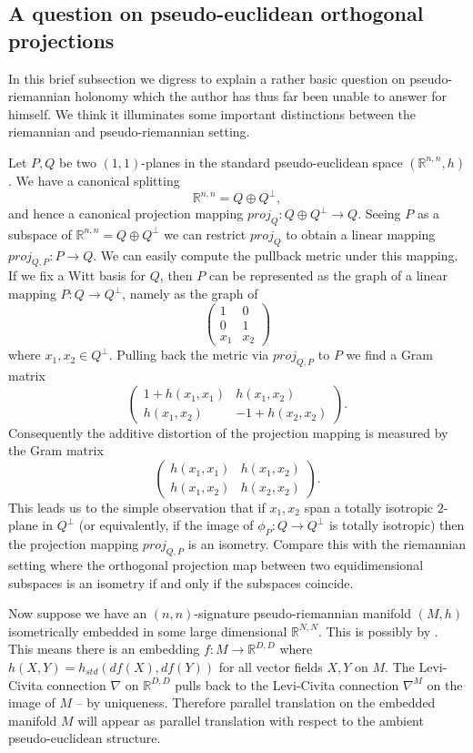 \documentclass[12pt]{amsart}
\theoremstyle{definition}
\theoremstyle{remark}
\newcommand{\bR}{\mathbb{R}}
\begin{document}
\subsection{A question on pseudo-euclidean orthogonal projections}\label{qqq}
In this brief subsection we digress to explain a rather basic question on pseudo-riemannian holonomy which the author has thus far been unable to answer for himself. We think it illuminates some important distinctions between the riemannian and pseudo-riemannian setting. 

Let $P,Q$ be two $(1,1)$-planes in the standard pseudo-euclidean space $(\bR^{n,n}, h)$. We have a canonical splitting $$\bR^{n,n}= Q \oplus Q^\perp, $$ and hence a canonical projection mapping $proj_Q: Q \oplus Q^\perp \to Q$. Seeing $P$ as a subspace of $\bR^{n,n}=Q\oplus Q^\perp$ we can restrict $proj_Q$ to obtain a linear mapping $proj_{Q,P}: P \to Q$. We can easily compute the pullback metric under this mapping. If we fix a Witt basis for $Q$, then $P$ can be represented as the graph of a linear mapping $P:Q \to Q^\perp$, namely as the graph of $$\begin{pmatrix} 1 & 0 \\ 0 & 1 \\ x_1 & x_2\end{pmatrix}$$ where $x_1, x_2 \in Q^\perp$. Pulling back the metric via $proj_{Q, P}$ to $P$ we find a Gram matrix $$\begin{pmatrix} 1 + h(x_1,x_1) & h(x_1,x_2) \\ h(x_1, x_2) & -1 + h(x_2, x_2)\end{pmatrix}.$$ Consequently the additive distortion of the projection mapping is measured by the Gram matrix $$\begin{pmatrix} h(x_1,x_1) & h(x_1,x_2) \\ h(x_1, x_2) &  h(x_2, x_2)\end{pmatrix}.$$ This leads us to the simple observation that if $x_1, x_2$ span a totally isotropic $2$-plane in $Q^\perp$ (or equivalently, if the image of $\phi_P:Q \to Q^\perp$ is totally isotropic) then the projection mapping $proj_{Q,P}$ is an isometry. Compare this with the riemannian setting where the orthogonal projection map between two equidimensional subspaces is an isometry if and only if the subspaces coincide. 

Now suppose we have an $(n,n)$-signature pseudo-riemannian manifold $(M,h)$ isometrically embedded in some large dimensional $\bR^{N,N}$. This is possibly by \cite{C}. This means there is an embedding $f: M \to \bR^{D,D}$ where $h(X,Y)=h_{std}(df(X), df(Y))$ for all vector fields $X,Y$ on $M$. The Levi-Civita connection $\nabla$ on $\bR^{D,D}$ pulls back to the Levi-Civita connection $\nabla^M$ on the image of $M$ -- by uniqueness. Therefore parallel translation on the embedded manifold $M$ will appear as parallel translation with respect to the ambient pseudo-euclidean structure. 
\end{document}
